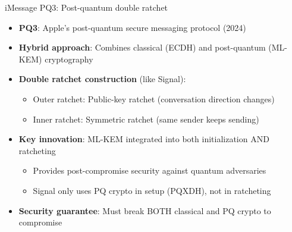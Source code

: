 \documentclass[aspectratio=169, lualatex, handout]{beamer}
\begin{document}
\begin{frame}{iMessage PQ3: Post-quantum double ratchet}
	\begin{itemize}
		\item \textbf{PQ3}: Apple's post-quantum secure messaging protocol (2024)
		\item \textbf{Hybrid approach}: Combines classical (ECDH) and post-quantum (ML-KEM) cryptography
		\item \textbf{Double ratchet construction} (like Signal):
		      \begin{itemize}
			      \item Outer ratchet: Public-key ratchet (conversation direction changes)
			      \item Inner ratchet: Symmetric ratchet (same sender keeps sending)
		      \end{itemize}
		\item \textbf{Key innovation}: ML-KEM integrated into both initialization AND ratcheting
		      \begin{itemize}
			      \item Provides post-compromise security against quantum adversaries
			      \item Signal only uses PQ crypto in setup (PQXDH), not in ratcheting
		      \end{itemize}
		\item \textbf{Security guarantee}: Must break BOTH classical and PQ crypto to compromise
	\end{itemize}
\end{frame}
\end{document}
